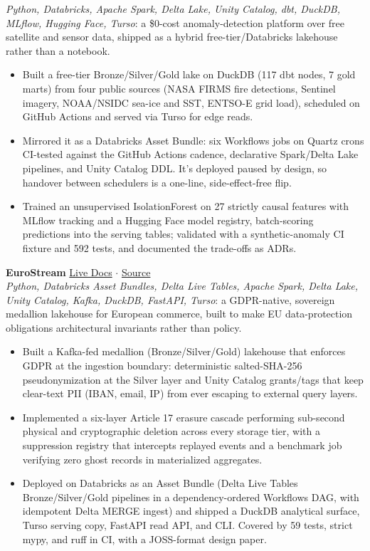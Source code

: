 \documentclass[10.5pt,letterpaper]{article}
\begin{document}
\textit{Python, Databricks, Apache Spark, Delta Lake, Unity Catalog, dbt, DuckDB, MLflow, Hugging Face, Turso}: a \$0-cost anomaly-detection platform over free satellite and sensor data, shipped as a hybrid free-tier/Databricks lakehouse rather than a notebook.
\begin{itemize}
  \item Built a free-tier Bronze/Silver/Gold lake on DuckDB (117 dbt nodes, 7 gold marts) from four public sources (NASA FIRMS fire detections, Sentinel imagery, NOAA/NSIDC sea-ice and SST, ENTSO-E grid load), scheduled on GitHub Actions and served via Turso for edge reads.
  \item Mirrored it as a Databricks Asset Bundle: six Workflows jobs on Quartz crons CI-tested against the GitHub Actions cadence, declarative Spark/Delta Lake pipelines, and Unity Catalog DDL. It's deployed paused by design, so handover between schedulers is a one-line, side-effect-free flip.
  \item Trained an unsupervised IsolationForest on 27 strictly causal features with MLflow tracking and a Hugging Face model registry, batch-scoring predictions into the serving tables; validated with a synthetic-anomaly CI fixture and 592 tests, and documented the trade-offs as ADRs.
\end{itemize}
\vspace{2pt}
\textbf{EuroStream} \hfill \href{https://eurostream-api.onrender.com/}{Live Docs} $\cdot$ \href{https://github.com/swadhinbiswas/eurostream}{Source} \\
\textit{Python, Databricks Asset Bundles, Delta Live Tables, Apache Spark, Delta Lake, Unity Catalog, Kafka, DuckDB, FastAPI, Turso}: a GDPR-native, sovereign medallion lakehouse for European commerce, built to make EU data-protection obligations architectural invariants rather than policy.
\begin{itemize}
  \item Built a Kafka-fed medallion (Bronze/Silver/Gold) lakehouse that enforces GDPR at the ingestion boundary: deterministic salted-SHA-256 pseudonymization at the Silver layer and Unity Catalog grants/tags that keep clear-text PII (IBAN, email, IP) from ever escaping to external query layers.
  \item Implemented a six-layer Article 17 erasure cascade performing sub-second physical and cryptographic deletion across every storage tier, with a suppression registry that intercepts replayed events and a benchmark job verifying zero ghost records in materialized aggregates.
  \item Deployed on Databricks as an Asset Bundle (Delta Live Tables Bronze/Silver/Gold pipelines in a dependency-ordered Workflows DAG, with idempotent Delta MERGE ingest) and shipped a DuckDB analytical surface, Turso serving copy, FastAPI read API, and CLI. Covered by 59 tests, strict mypy, and ruff in CI, with a JOSS-format design paper.
\end{itemize}
\end{document}
